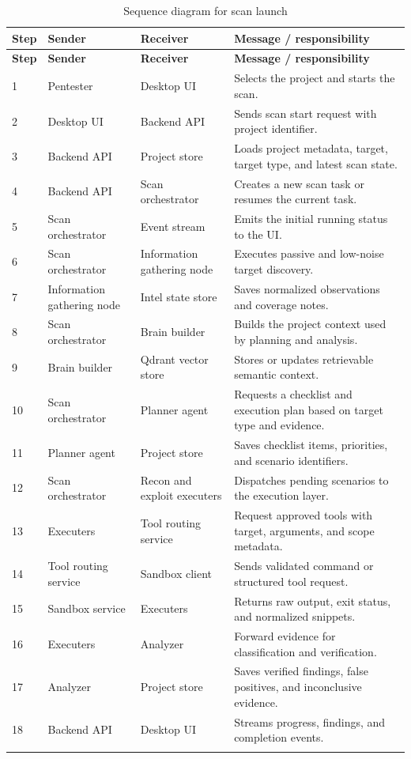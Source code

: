 \documentclass[12pt,a4paper]{report}
\begin{document}
\begin{longtable}{|p{}|p{}|p{}|p{}|}
\hline
\textbf{Step} & \textbf{Sender} & \textbf{Receiver} & \textbf{Message / responsibility} \\
\hline
\endfirsthead
\hline
\textbf{Step} & \textbf{Sender} & \textbf{Receiver} & \textbf{Message / responsibility} \\
\hline
\endhead
1 & Pentester & Desktop UI & Selects the project and starts the scan. \\
\hline
2 & Desktop UI & Backend API & Sends scan start request with project identifier. \\
\hline
3 & Backend API & Project store & Loads project metadata, target, target type, and latest scan state. \\
\hline
4 & Backend API & Scan orchestrator & Creates a new scan task or resumes the current task. \\
\hline
5 & Scan orchestrator & Event stream & Emits the initial running status to the UI. \\
\hline
6 & Scan orchestrator & Information gathering node & Executes passive and low-noise target discovery. \\
\hline
7 & Information gathering node & Intel state store & Saves normalized observations and coverage notes. \\
\hline
8 & Scan orchestrator & Brain builder & Builds the project context used by planning and analysis. \\
\hline
9 & Brain builder & Qdrant vector store & Stores or updates retrievable semantic context. \\
\hline
10 & Scan orchestrator & Planner agent & Requests a checklist and execution plan based on target type and evidence. \\
\hline
11 & Planner agent & Project store & Saves checklist items, priorities, and scenario identifiers. \\
\hline
12 & Scan orchestrator & Recon and exploit executers & Dispatches pending scenarios to the execution layer. \\
\hline
13 & Executers & Tool routing service & Request approved tools with target, arguments, and scope metadata. \\
\hline
14 & Tool routing service & Sandbox client & Sends validated command or structured tool request. \\
\hline
15 & Sandbox service & Executers & Returns raw output, exit status, and normalized snippets. \\
\hline
16 & Executers & Analyzer & Forward evidence for classification and verification. \\
\hline
17 & Analyzer & Project store & Saves verified findings, false positives, and inconclusive evidence. \\
\hline
18 & Backend API & Desktop UI & Streams progress, findings, and completion events. \\
\hline
\caption{Sequence diagram for scan launch}
\label{tab:seq_scan_launch}
\end{longtable}
\end{document}
